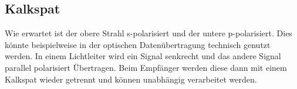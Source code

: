 \subsection{Kalkspat}
Wie erwartet ist der obere Strahl s-polarisiert und der untere p-polarisiert. Dies könnte beispielweise in der optischen Datenübertragung technisch genutzt werden. In einem Lichtleiter wird ein Signal senkrecht und das andere Signal parallel polarisiert Übertragen. Beim Empfänger werden diese dann mit einem Kalkspat wieder getrennt und können unabhängig verarbeitet werden.